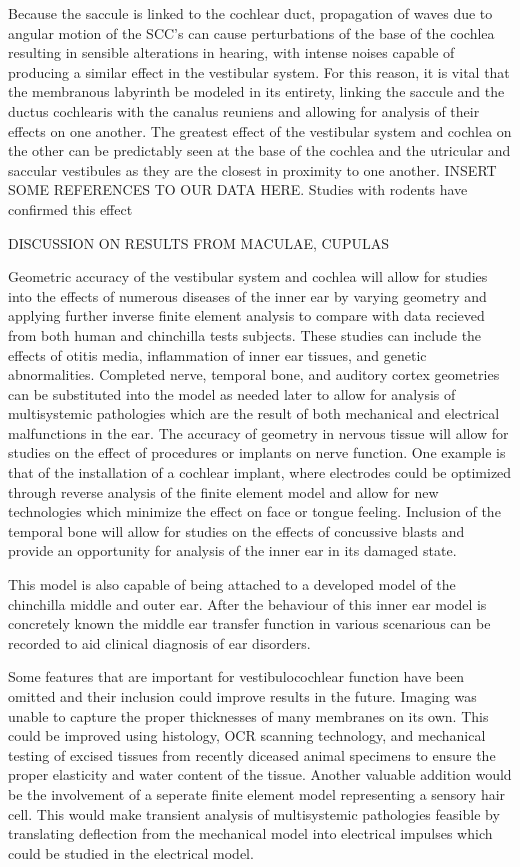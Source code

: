 \documentclass[12pt]{article}
\begin{document}
Because the saccule is linked to the cochlear duct, propagation of waves due to angular motion of the SCC’s can cause perturbations of the base of the cochlea resulting in sensible alterations in hearing, with intense noises capable of producing a similar effect in the vestibular system. For this reason, it is vital that the membranous labyrinth be modeled in its entirety, linking the saccule and the ductus cochlearis with the canalus reuniens and allowing for analysis of their effects on one another. The greatest effect of the vestibular system and cochlea on the other can be predictably seen at the base of the cochlea and the utricular and saccular vestibules as they are the closest in proximity to one another. INSERT SOME REFERENCES TO OUR DATA HERE.  Studies with rodents have confirmed this effect \cite{mizrachi}

DISCUSSION ON RESULTS FROM MACULAE, CUPULAS

Geometric accuracy of the vestibular system and cochlea will allow for studies into the effects of numerous diseases of the inner ear by varying geometry and applying further inverse finite element analysis to compare with data recieved from both human and chinchilla tests subjects. These studies can include the effects of otitis media, inflammation of inner ear tissues, and genetic abnormalities. Completed nerve, temporal bone, and auditory cortex geometries can be substituted into the model as needed later to allow for analysis of multisystemic pathologies which are the result of both mechanical and electrical malfunctions in the ear. The accuracy of geometry in nervous tissue will allow for studies on the effect of procedures or implants on nerve function. One example is that of the installation of a cochlear implant, where electrodes could be optimized through reverse analysis of the finite element model and allow for new technologies which minimize the effect on face or tongue feeling. Inclusion of the temporal bone will allow for studies on the effects of concussive blasts and provide an opportunity for analysis of the inner ear in its damaged state.

This model is also capable of being attached to a developed model of the chinchilla middle and outer ear. After the behaviour of this inner ear model is concretely known the middle ear transfer function in various scenarious can be recorded to aid clinical diagnosis of ear disorders.

Some features that are important for vestibulocochlear function have been omitted and their inclusion could improve results in the future. Imaging was unable to capture the proper thicknesses of many membranes on its own. This could be improved using histology, OCR scanning technology, and mechanical testing of excised tissues from recently diceased animal specimens to ensure the proper elasticity and water content of the tissue. Another valuable addition would be the involvement of a seperate finite element model representing a sensory hair cell. This would make transient analysis of multisystemic pathologies feasible by translating deflection from the mechanical model into electrical impulses which could be studied in the electrical model. \cite{choi} 
\end{document}
